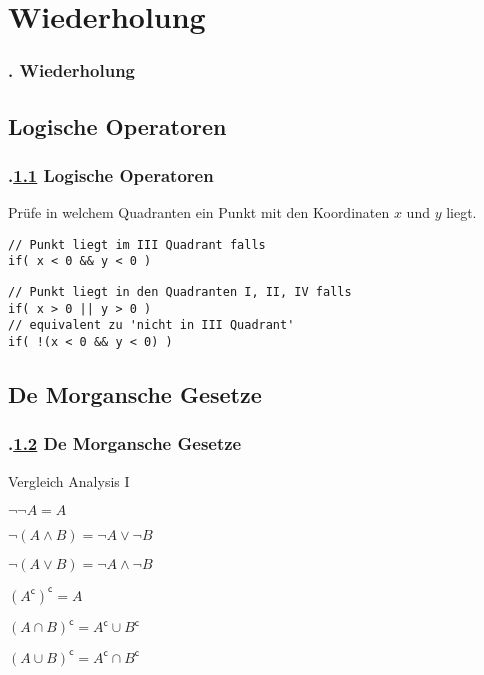 \section{Wiederholung}\label{K:wdh}
\begin{frame}
  \frametitle{\kap. Wiederholung}%
\tableofcontents[current]
\end{frame}


\def\sstitle{Logische Operatoren}
\subsection{\sstitle}\label{S:LogiOperatoren}
\begin{frame}[fragile]%
  \frametitle{\kap.\ref{S:LogiOperatoren} \sstitle}%

Prüfe in welchem Quadranten ein Punkt mit den Koordinaten $x$ und $y$ liegt.

\begin{lstlisting}[style=java, frame=single]
// Punkt liegt im III Quadrant falls
if( x < 0 && y < 0 )
\end{lstlisting}
\begin{lstlisting}[style=java, frame=single]
// Punkt liegt in den Quadranten I, II, IV falls
if( x > 0 || y > 0 )
// equivalent zu 'nicht in III Quadrant'
if( !(x < 0 && y < 0) )
\end{lstlisting}
\end{frame}

\def\stitle{De Morgansche Gesetze}
\subsection{\stitle}\label{S:Morgansche}
\begin{frame}[fragile]%
  \frametitle{\kap.\ref{S:Morgansche} \stitle}%
Vergleich Analysis I
\medskip

\begin{description}
  \item[und bzw. oder]
  \item $\neg \neg A = A$
  \item $\neg (A \wedge B) = \neg A \vee \neg B$
  \item $\neg (A \vee B) = \neg A \wedge \neg B$
\end{description}
\medskip

\begin{description}
  \item[Schnittmenge bzw. Vereinigung]
  \item $(A^{\mathsf{c}})^{\mathsf{c}} = A$
  \item $(A \cap B)^{\mathsf{c}} = A^{\mathsf{c}} \cup B^{\mathsf{c}}$
  \item $(A \cup B)^{\mathsf{c}} = A^{\mathsf{c}} \cap B^{\mathsf{c}}$
\end{description}
\end{frame}

